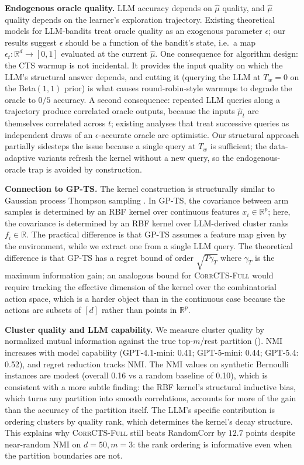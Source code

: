 \documentclass{article}
\theoremstyle{plain}
\theoremstyle{definition}
\theoremstyle{remark}
\newcommand{\R}{\mathbb{R}}
\newcommand{\CorrFull}{\textsc{CorrCTS-Full}}
\begin{document}
\textbf{Endogenous oracle quality.}
LLM accuracy depends on $\hat\mu$ quality, and $\hat\mu$ quality depends on the learner's exploration trajectory.
Existing theoretical models for LLM-bandits treat oracle quality as an exogenous parameter $\epsilon$; our results suggest $\epsilon$ should be a function of the bandit's state, i.e.\ a map $\epsilon_t: \mathbb{R}^d \to [0,1]$ evaluated at the current $\hat\mu$.
One consequence for algorithm design: the CTS warmup is not incidental.
It provides the input quality on which the LLM's structural answer depends, and cutting it (querying the LLM at $T_w = 0$ on the Beta$(1,1)$ prior) is what causes round-robin-style warmups to degrade the oracle to $0/5$ accuracy.
A second consequence: repeated LLM queries along a trajectory produce correlated oracle outputs, because the inputs $\hat\mu_t$ are themselves correlated across $t$; existing analyses that treat successive queries as independent draws of an $\epsilon$-accurate oracle are optimistic.
Our structural approach partially sidesteps the issue because a single query at $T_w$ is sufficient; the data-adaptive variants refresh the kernel without a new query, so the endogenous-oracle trap is avoided by construction.

\textbf{Connection to GP-TS.}
The kernel construction is structurally similar to Gaussian process Thompson sampling \citep{srinivas2010gpucb}.
In GP-TS, the covariance between arm samples is determined by an RBF kernel over continuous features $x_i \in \R^p$; here, the covariance is determined by an RBF kernel over LLM-derived cluster ranks $f_i \in \R$.
The practical difference is that GP-TS assumes a feature map given by the environment, while we extract one from a single LLM query.
The theoretical difference is that GP-TS has a regret bound of order $\sqrt{T \gamma_T}$ where $\gamma_T$ is the maximum information gain; an analogous bound for \CorrFull{} would require tracking the effective dimension of the kernel over the combinatorial action space, which is a harder object than in the continuous case because the actions are subsets of $[d]$ rather than points in $\R^p$.

\textbf{Cluster quality and LLM capability.}
We measure cluster quality by normalized mutual information against the true top-$m$/rest partition ().
NMI increases with model capability (GPT-4.1-mini: 0.41; GPT-5-mini: 0.44; GPT-5.4: 0.52), and regret reduction tracks NMI.
The NMI values on synthetic Bernoulli instances are modest (overall 0.16 vs a random baseline of 0.10), which is consistent with a more subtle finding: the RBF kernel's structural inductive bias, which turns any partition into smooth correlations, accounts for more of the gain than the accuracy of the partition itself.
The LLM's specific contribution is ordering clusters by quality rank, which determines the kernel's decay structure.
This explains why \CorrFull{} still beats RandomCorr by $12.7$ points despite near-random NMI on $d = 50, m = 3$: the rank ordering is informative even when the partition boundaries are not.
\end{document}
